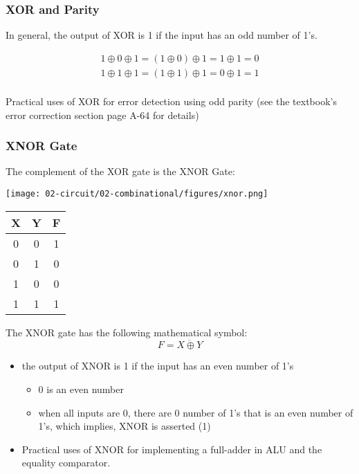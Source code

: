 \begin{frame}\frametitle{XOR and Parity}
In general, the output of XOR is 1 if the input has an odd number of 1's.

\begin{align*}
1 \oplus 0 \oplus 1 = (1 \oplus 0) \oplus 1 = 1 \oplus 1 =  0 \\
1 \oplus 1 \oplus 1 = (1 \oplus 1) \oplus 1 = 0 \oplus 1 =  1 \\
\end{align*}

Practical uses of XOR for error detection using odd parity (see the textbook's error correction section page A-64 for details)

\end{frame}

\begin{frame}\frametitle{XNOR Gate}
The complement of the XOR gate is the XNOR Gate:
\begin{multicols}{2}
\texttt{[image: 02-circuit/02-combinational/figures/xnor.png]}
\columnbreak

\begin{center}
    \begin{tabular}{cc|c}
         X & Y & F \\
         \hline
         0 & 0 & 1\\
         \hline
         0 & 1 & 0\\
        \hline
         1 & 0 & 0\\
         \hline
         1 & 1 & 1\\
         \hline
    \end{tabular}
\end{center}
\end{multicols}
The XNOR gate has the following mathematical symbol:
$$F = \overline{X \oplus Y}$$
\begin{itemize}
    \item  the output of XNOR is 1 if the input has an even number of 1's
    \small
    \begin{itemize}
        \item 0 is an even number 
        \item when all inputs are 0, there are 0 number of 1's that is an even number of 1's, which implies, XNOR is asserted (1)
    \end{itemize}
    \item Practical uses of XNOR for implementing a full-adder in ALU and the equality  comparator.
\end{itemize}
\end{frame}

